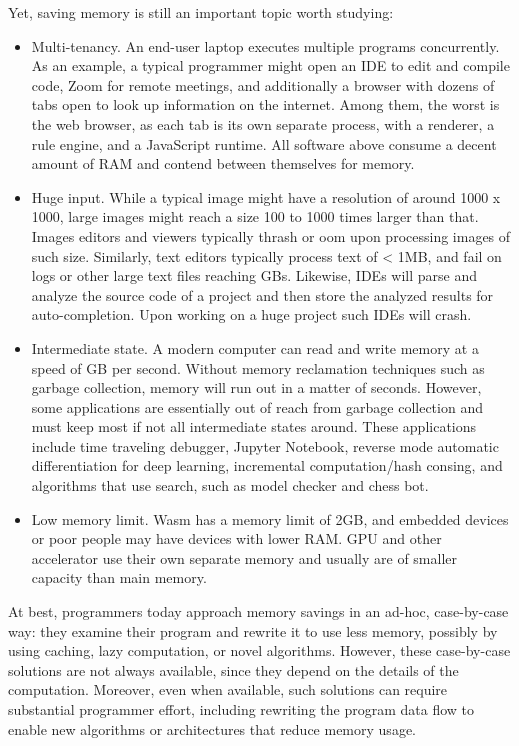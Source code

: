 Yet, saving memory is still an important topic worth studying:
\begin{itemize}
    \item Multi-tenancy. An end-user laptop executes multiple programs concurrently. As an example, a typical programmer might open an IDE to edit and compile code, Zoom for remote meetings, and additionally a browser with dozens of tabs open to look up information on the internet. Among them, the worst is the web browser, as each tab is its own separate process, with a renderer, a rule engine, and a JavaScript runtime. All software above consume a decent amount of RAM and contend between themselves for memory.
    \item Huge input. While a typical image might have a resolution of around 1000 x 1000, large images might reach a size 100 to 1000 times larger than that. Images editors and viewers typically thrash or oom upon processing images of such size. Similarly, text editors typically process text of < 1MB, and fail on logs or other large text files reaching GBs. Likewise, IDEs will parse and analyze the source code of a project and then store the analyzed results for auto-completion. Upon working on a huge project such IDEs will crash.
    \item Intermediate state. A modern computer can read and write memory at a speed of GB per second. Without memory reclamation techniques such as garbage collection, memory will run out in a matter of seconds. However, some applications are essentially out of reach from garbage collection and must keep most if not all intermediate states around. These applications include time traveling debugger, Jupyter Notebook, reverse mode automatic differentiation for deep learning, incremental computation/hash consing, and algorithms that use search, such as model checker and chess bot.
    \item Low memory limit. Wasm has a memory limit of 2GB, and embedded devices or poor people may have devices with lower RAM. GPU and other accelerator use their own separate memory and usually are of smaller capacity than main memory.
\end{itemize}

At best, programmers today approach memory savings
  in an ad-hoc, case-by-case way:
  they examine their program
  and rewrite it to use less memory,
  possibly by using caching, lazy computation, or novel algorithms.
However, these case-by-case solutions
  are not always available,
  since they depend on the details of the computation.
Moreover, even when available, 
  such solutions can require substantial programmer effort,
  including rewriting the program data flow
  to enable new algorithms or architectures
  that reduce memory usage.

